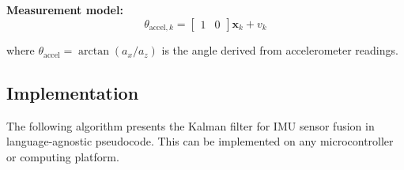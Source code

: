 \textbf{Measurement model:}
\begin{equation}
\theta_{\text{accel},k} = \begin{bmatrix} 1 & 0 \end{bmatrix} \mathbf{x}_k + v_k
\end{equation}

where $\theta_{\text{accel}} = \arctan(a_x / a_z)$ is the angle derived from accelerometer readings.

\subsection{Implementation}

The following algorithm presents the Kalman filter for IMU sensor fusion in language-agnostic pseudocode. This can be implemented on any microcontroller or computing platform.


